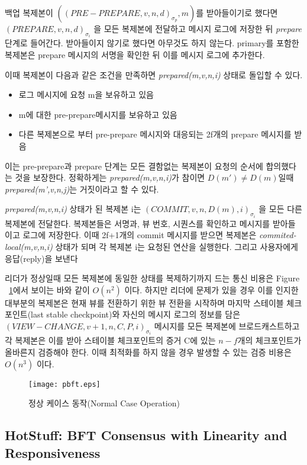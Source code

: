 백업 복제본이 \(((PRE-PREPARE,v,n,d)_{\sigma_{p}},m)\)를 받아들이기로 했다면 \((PREPARE,v,n,d)_{\sigma_{i}}\)
을 모든 복제본에 전달하고 메시지 로그에 저장한 뒤 \textit{prepare} 단계로 들어간다. 받아들이지 않기로 했다면
 아무것도 하지 않는다. primary를 포함한 복제본은 prepare 메시지의 서명을 확인한 뒤 이를 메시지 로그에 추가한다.

이때 복제본이 다음과 같은 조건을 만족하면 \textit{prepared(m,v,n,i)} 상태로 돌입할 수 있다. 
\begin{itemize}
\item 로그 메시지에 요청 m을 보유하고 있음
\item m에 대한 pre-prepare메시지를 보유하고 있음
\item 다른 복제본으로 부터 pre-prepare 메시지와 대응되는 2f개의 prepare 메시지를 받음
\end{itemize}
이는 pre-prepare과 prepare 단계는 모든 결함없는 복제본이 요청의 순서에 합의했다는 것을 보장한다. 
정확하게는 \textit{prepared(m,v,n,i)}가 참이면 \(D(m') \neq D(m)\)일때 
\textit{prepared(m',v,n,j)}는 거짓이라고 할 수 있다. 

\textit{prepared(m,v,n,i)} 상태가 된 복제본 i는 \((COMMIT,v,n,D(m),i)_{\sigma_{i}}\) 을
모든 다른 복제본에 전달한다. 복제본들은 서명과, 뷰 번호, 시퀀스를 확인하고 메시지를 받아들이고
로그에 저장한다. 이때 2f+1개의 commit 메시지를 받으면 복제본은 \textit{commited-local(m,v,n,i)} 상태가 되며
각 복제본 i는 요청된 연산을 실행한다. 그리고 사용자에게 응답(reply)을 보낸다

리더가 정상일때 모든 복제본에 동일한 상태를 복제하기까지 드는 통신
비용은 Figure ~\ref{fig:1}에서 보이는 바와 같이 \(O(n^{2})\) 이다.
하지만 리더에 문제가 있을 경우 이를 인지한 대부분의 복제본은 현재 뷰를 전환하기 위한 뷰 전환을 시작하며
마지막 스테이블 체크포인트(last stable checkpoint)와 자신의 메시지 로그의 정보를 담은 
\((VIEW-CHANGE,v+1,n,C,P,i)_{\sigma_{i}}\) 메시지를 모든 복제본에 브로드캐스트하고 
각 복제본은 이를 받아 스테이블 체크포인트의 증거 C에 있는 \(n-f\)개의 체크포인트가 올바른지 검증해야 한다.
이때 최적화를 하지 않을 경우 발생할 수 있는 검증 비용은 \(O(n^{3})\) 이다.

\begin{figure}
  \texttt{[image: pbft.eps]}
\caption{정상 케이스 동작(Normal Case Operation)}
\label{fig:1}       %
\end{figure}

\subsection{HotStuff: BFT Consensus with Linearity and Responsiveness}

